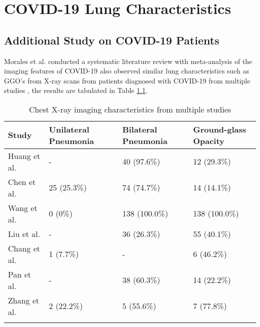 
\chapter{COVID-19 Lung Characteristics} \label{COVID-19 Lung Characteristics} %


\section*{Additional Study on COVID-19 Patients}

Morales et al. conducted a systematic literature review with meta-analysis 
of the imaging features of COVID-19 also observed similar lung characteristics 
such as GGO's from X-ray scans from patients diagnosed with COVID-19 from 
multiple studies \cite{RAJ+2020}, the results are tabulated in Table \ref{tab:Chest X-ray Review Results}.
\vspace{1em}

\begin{longtable}{| p{} | p{} | p{} | p{} |} 
    
    \hline
\textbf{Study} & \textbf{Unilateral Pneumonia} & \textbf{Bilateral Pneumonia} & \textbf{Ground-glass Opacity} \\
\hline

Huang et al. \cite{CYX+2020} & - & 40 (97.6\%) & 12 (29.3\%)\\ \hline
Chen et al. \cite{CNM+2020} & 25 (25.3\%) & 74 (74.7\%) & 14 (14.1\%)\\ \hline
Wang et al. \cite{WDC+2020} & 0 (0\%)& 138 (100.0\%) & 138 (100.0\%)\\ \hline
Liu et al. \cite{LKY+2020} & - & 36 (26.3\%) & 55 (40.1\%)\\ \hline
Chang et al. \cite{CML+2020} & 1 (7.7\%)& - & 6 (46.2\%)\\ \hline
Pan et al. \cite{PYH+2020} & - & 38 (60.3\%) & 14 (22.2\%)\\ \hline
Zhang et al. \cite{ZMX+2020} & 2 (22.2\%)& 5 (55.6\%)& 7 (77.8\%)\\ \hline

 \caption{Chest X-ray imaging characteristics from multiple studies}

    \label{tab:Chest X-ray Review Results}
    \end{longtable}
\vspace{-1em}